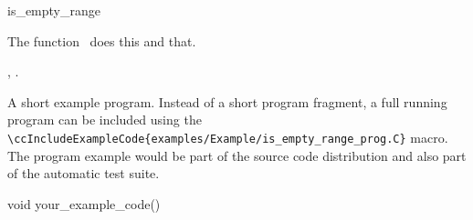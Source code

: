 
\gdef\ccRefPageBegin{\ccParDims\cgalColumnLayout\begin{ccAdvanced}}
\gdef\ccRefPageEnd{\ccParDims\cgalColumnLayout\end{ccAdvanced}}
\begin{ccRefFunction}{is_empty_range}  %


\ccDefinition
  
The function \ccRefName\ does this and that.



\ccIsModel


\ccSeeAlso

,
.

\ccExample

A short example program.
Instead of a short program fragment, a full running program can be
included using the 
\verb|\ccIncludeExampleCode{examples/Example/is_empty_range_prog.C}| 
macro. The program example would be part of the source code distribution and
also part of the automatic test suite.

\begin{ccExampleCode}
void your_example_code() {
}
\end{ccExampleCode}


\end{ccRefFunction}
\gdef\ccRefPageBegin{\ccParDims\cgalColumnLayout}
\gdef\ccRefPageEnd{\ccParDims\cgalColumnLayout}



